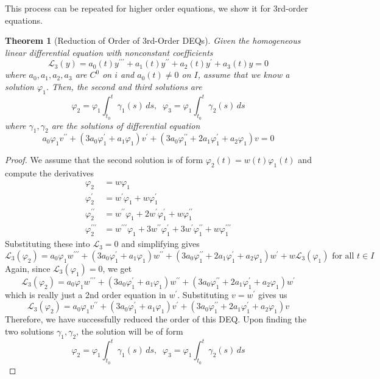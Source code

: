 \documentclass{article}
\newtheorem{theorem}{Theorem}[section]
\theoremstyle{remark}
\theoremstyle{definition}
\begin{document}
      This process can be repeated for higher order equations, we show it for 3rd-order equations. 

      \begin{theorem}[Reduction of Order of 3rd-Order DEQs]
      Given the homogeneous linear differential equation with nonconstant coefficients
      \[\mathcal{L}_3 (y) = a_0 (t) y^{\prime\prime\prime} + a_1 (t) y^{\prime\prime} + a_2 (t) y^\prime + a_3 (t) y = 0\]
      where $a_0, a_1, a_2, a_3$ are $C^0$ on $i$ and $a_0 (t) \neq 0$ on $I$, assume that we know a solution $\varphi_1$. Then, the second and third solutions are
      \[\varphi_2 = \varphi_1 \int_{t_0}^t \gamma_1(s)\,ds, \;\;\varphi_3 = \varphi_1 \int_{t_0}^t \gamma_2(s)\,ds\]
      where $\gamma_1, \gamma_2$ are the solutions of differential equation
      \[a_0 \varphi_1 v^{\prime\prime} + (3a_0 \varphi_1^\prime + a_1 \varphi_1) v^\prime + (3 a_0 \varphi_1^{\prime\prime} + 2a_1 \varphi_1^\prime + a_2 \varphi_1) v = 0\]
      \end{theorem}
      \begin{proof}
      We assume that the second solution is of form $\varphi_2 (t) = w(t) \varphi_1(t)$ and compute the derivatives 
      \begin{align*}
          \varphi_2 & = w \varphi_1 \\
          \varphi_2^\prime & = w^\prime \varphi_1 + w \varphi_1^\prime \\
          \varphi_2^{\prime\prime} & = w^{\prime\prime} \varphi_1 + 2 w^\prime \varphi_1^\prime + w \varphi_1^{\prime\prime} \\
          \varphi_2^{\prime\prime\prime} & = w^{\prime\prime\prime} \varphi_1 + 3 w^{\prime\prime} \varphi_1^\prime + 3 w^\prime \varphi_1^{\prime\prime} + w \varphi_1^{\prime\prime\prime}
      \end{align*}
      Substituting these into $\mathcal{L}_3 = 0$ and simplifying gives
      \[\mathcal{L}_3 (\varphi_2) = a_0 \varphi_1 w^{\prime\prime\prime} + (3a_0 \varphi_1^\prime + a_1\varphi_1) w^{\prime\prime} + (3 a_0 \varphi_1^{\prime\prime} + 2a_1 \varphi_1^\prime + a_2 \varphi_1) w^\prime + w \mathcal{L}_3 (\varphi_1) \text{ for all } t\in I\]
      Again, since $\mathcal{L}_3 (\varphi_1) = 0$, we get
      \[\mathcal{L}_3 (\varphi_2) = a_0 \varphi_1 w^{\prime\prime\prime} + (3a_0 \varphi_1^\prime + a_1\varphi_1) w^{\prime\prime} + (3 a_0 \varphi_1^{\prime\prime} + 2a_1 \varphi_1^\prime + a_2 \varphi_1) w^\prime\]
      which is really just a 2nd order equation in $w^\prime$. Substituting $v = w^\prime$ gives us
      \[\mathcal{L}_3 (\varphi_2) = a_0 \varphi_1 v^{\prime\prime} + (3a_0 \varphi_1^\prime + a_1 \varphi_1) v^\prime + (3 a_0 \varphi_1^{\prime\prime} + 2a_1 \varphi_1^\prime + a_2 \varphi_1) v \]
      Therefore, we have successfully reduced the order of this DEQ. Upon finding the two solutions $\gamma_1, \gamma_2$, the solution will be of form 
      \[\varphi_2 = \varphi_1 \int_{t_0}^t \gamma_1(s)\,ds, \;\;\varphi_3 = \varphi_1 \int_{t_0}^t \gamma_2(s)\,ds\]
      \end{proof}
\end{document}
